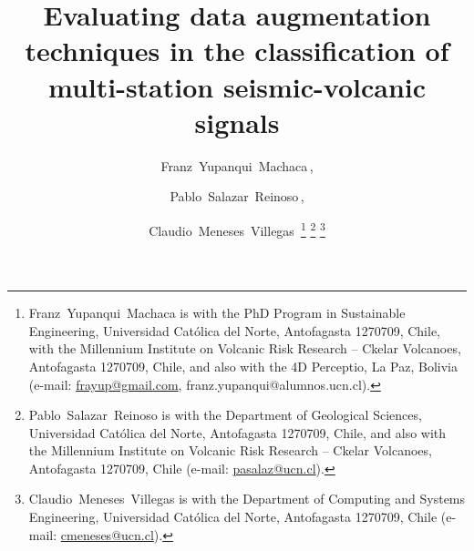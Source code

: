 \documentclass[lettersize,journal]{IEEEtran}
\begin{document}
\title{Evaluating data augmentation techniques in the classification of multi-station seismic-volcanic signals}

\author{Franz~Yupanqui~Machaca\,, \and Pablo~Salazar~Reinoso\,, \and Claudio~Meneses~Villegas\,
\thanks{Franz~Yupanqui~Machaca is with the PhD Program in Sustainable Engineering, Universidad Católica del Norte, Antofagasta 1270709, Chile, with the Millennium Institute on Volcanic Risk Research – Ckelar Volcanoes, Antofagasta 1270709, Chile, and also with the 4D Perceptio, La Paz, Bolivia (e-mail: \href{mailto:frayup@gmail.com}{frayup@gmail.com}, franz.yupanqui@alumnos.ucn.cl).}
\thanks{Pablo~Salazar~Reinoso is with the Department of Geological Sciences, Universidad Católica del Norte, Antofagasta 1270709, Chile, and also with the Millennium Institute on Volcanic Risk Research – Ckelar Volcanoes, Antofagasta 1270709, Chile  (e-mail: \href{mailto:pasalaz@ucn.cl}{pasalaz@ucn.cl}).}
\thanks{Claudio~Meneses~Villegas is with the Department of Computing and Systems Engineering, Universidad Católica del Norte, Antofagasta 1270709, Chile  (e-mail: \href{mailto:cmeneses@ucn.cl}{cmeneses@ucn.cl}).}
}



\maketitle
\end{document}
